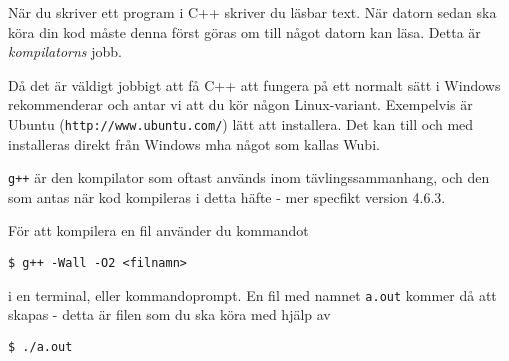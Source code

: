 När du skriver ett program i C++ skriver du läsbar text. När datorn sedan ska köra din kod måste denna först göras om till något datorn kan läsa. Detta är \emph{kompilatorns} jobb.

Då det är väldigt jobbigt att få C++ att fungera på ett normalt sätt i Windows rekommenderar och antar vi att du kör någon Linux-variant. Exempelvis är Ubuntu (\texttt{http://www.ubuntu.com/}) lätt att installera. Det kan till och med installeras direkt från Windows mha något som kallas Wubi.

\texttt{g++} är den kompilator som oftast används inom tävlingssammanhang, och den som antas när kod kompileras i detta häfte - mer specfikt version 4.6.3.

För att kompilera en fil använder du kommandot

\texttt{\$ g++ -Wall -O2 <filnamn>}

i en terminal, eller kommandoprompt. En fil med namnet \texttt{a.out} kommer då att skapas - detta är filen som du ska köra med hjälp av

\texttt{\$ ./a.out}
